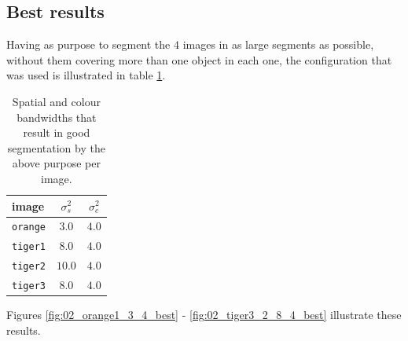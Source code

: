 \subsection{Best results}

Having as purpose to segment the $4$ images in as large segments as possible,
without them covering more than one object in each one, the configuration
that was used is illustrated in table \ref{tab:02_best_results}.

\begin{table}\centering
    \begin{tabular}{l|cc}
    image  & $\sigma_s^2$ & $\sigma_c^2$ \\ \hline
    \texttt{orange} & $3.0$        & $4.0$        \\
    \texttt{tiger1} & $8.0$        & $4.0$        \\
    \texttt{tiger2} & $10.0$       & $4.0$        \\
    \texttt{tiger3} & $8.0$        & $4.0$        \\
    \end{tabular}
    \caption{Spatial and colour bandwidths that result in good segmentation
      by the above purpose per image.}
    \label{tab:02_best_results}
\end{table}

Figures \ref{fig:02_orange1_3_4_best} - \ref{fig:02_tiger3_2_8_4_best}
illustrate these results.



